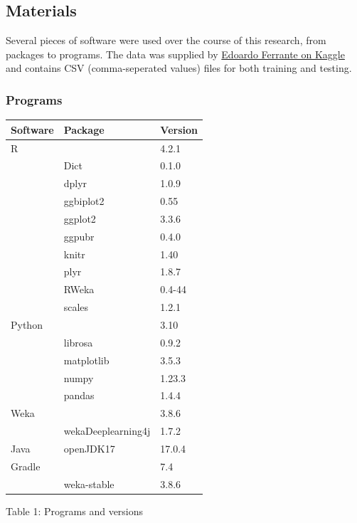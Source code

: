 \documentclass[
]{article}
\begin{document}
\hypertarget{materials}{%
\subsection{Materials}\label{materials}}

Several pieces of software were used over the course of this research,
from packages to programs. The data was supplied by
\href{https://www.kaggle.com/datasets/fleanend/birds-songs-numeric-dataset}{Edoardo
Ferrante on Kaggle} and contains CSV (comma-seperated values) files for
both training and testing.

\hypertarget{programs}{%
\subsubsection{Programs}\label{programs}}

\begin{longtable}[]{@{}lll@{}}
\toprule
\textbf{Software} & \textbf{Package} & \textbf{Version} \\
\midrule
\endhead
R & & 4.2.1 \\
& Dict & 0.1.0 \\
& dplyr & 1.0.9 \\
& ggbiplot2 & 0.55 \\
& ggplot2 & 3.3.6 \\
& ggpubr & 0.4.0 \\
& knitr & 1.40 \\
& plyr & 1.8.7 \\
& RWeka & 0.4-44 \\
& scales & 1.2.1 \\
Python & & 3.10 \\
& librosa & 0.9.2 \\
& matplotlib & 3.5.3 \\
& numpy & 1.23.3 \\
& pandas & 1.4.4 \\
Weka & & 3.8.6 \\
& wekaDeeplearning4j & 1.7.2 \\
Java & openJDK17 & 17.0.4 \\
Gradle & & 7.4 \\
& weka-stable & 3.8.6 \\
\bottomrule
\end{longtable}

\begin{center}
Table 1: Programs and versions \label{tab:tab1}
\end{center}
\end{document}

